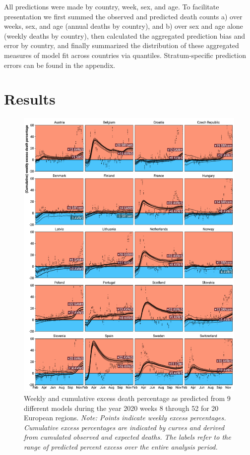 \documentclass[12pt]{article}
\begin{document}
All predictions were made by country, week, sex, and age. To facilitate presentation we first summed the observed and predicted death counts a) over weeks, sex, and age (annual deaths by country), and b) over sex and age alone (weekly deaths by country), then calculated the aggregated prediction bias and error by country, and finally summarized the distribution of these aggregated measures of model fit across countries via quantiles. Stratum-specific prediction errors can be found in the appendix.

\section*{Results}


\begin{figure}
  \caption{Weekly and cumulative excess death percentage as predicted from 9 different models during the year 2020 weeks 8 through 52 for 20 European regions. \emph{Note: Points indicate weekly excess percentages. Cumulative excess percentages are indicated by curves and derived from cumulated observed and expected deaths. The labels refer to the range of predicted percent excess over the entire analysis period.}}
  \label{fig:excess}
  \vspace{-1em}\includegraphics{excess.pdf}
\end{figure}
\end{document}
